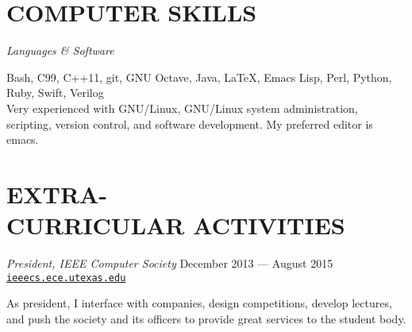 \documentclass[margin]{res}
\begin{document}
\begin{resume}
  \section{COMPUTER SKILLS}
  {\sl Languages \& Software} \\
  \vspace{-1.0em}
  \begin{adjustwidth}{1.5em}{0pt}
    Bash, C99, C++11, git, GNU Octave, Java, \LaTeX, Emacs Lisp, Perl, Python,
    Ruby, Swift, Verilog
    \vspace{0.5em} \\
    Very experienced with GNU/Linux, GNU/Linux system administration, scripting,
    version control, and software development. My preferred editor is emacs.
  \end{adjustwidth}

  \section{EXTRA-\\CURRICULAR ACTIVITIES}
  {\sl President, IEEE Computer Society}
  \hfill December 2013 --- August 2015 \\
  \href{http://ieeecs.ece.utexas.edu}{\ul{\texttt{ieeecs.ece.utexas.edu}}}
  \begin{adjustwidth}{1.5em}{0pt}
    As president, I interface with companies, design competitions, develop
    lectures, and push the society and its officers to provide great services to
    the student body.
   \end{adjustwidth}
\end{resume}
\end{document}

